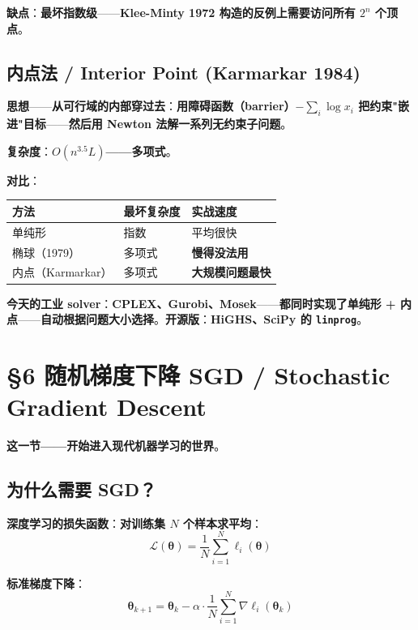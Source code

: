 \textbf{缺点}：\textbf{最坏指数级}——\textbf{Klee-Minty 1972 构造的反例上\textbf{需要访问所有 $2^n$ 个顶点}}。

\subsection{内点法 / Interior Point (Karmarkar 1984)}

\textbf{思想}——\textbf{从可行域的\textbf{内部}穿过去}：\textbf{用\textbf{障碍函数}（barrier）$-\sum_i \log x_i$ 把约束"嵌进"目标}——\textbf{然后用 Newton 法解一系列无约束子问题}。

\textbf{复杂度}：\textbf{$O(n^{3.5} L)$——多项式}。

\textbf{对比}：

\begin{tcolorbox}[essbox={LP 算法对比}]
\begin{tabular}{lll}
\toprule
\textbf{方法} & \textbf{最坏复杂度} & \textbf{实战速度} \\
\midrule
单纯形 & 指数 & 平均很快 \\
椭球（1979） & 多项式 & \textbf{慢得没法用} \\
内点（Karmarkar） & 多项式 & \textbf{大规模问题最快} \\
\bottomrule
\end{tabular}
\end{tcolorbox}

\textbf{今天的工业 solver}：\textbf{CPLEX、Gurobi、Mosek}——\textbf{都同时实现了单纯形 + 内点}——\textbf{自动根据问题大小选择}。\textbf{开源版}：\textbf{HiGHS、SciPy 的 \texttt{linprog}}。

\section{§6 随机梯度下降 SGD / Stochastic Gradient Descent}

\textbf{这一节——开始进入现代机器学习的世界}。

\subsection{为什么需要 SGD？}

\textbf{深度学习的损失函数}：\textbf{对训练集 $N$ 个样本求平均}：
\begin{equation}
\mathcal{L}(\bm \theta) = \frac{1}{N} \sum_{i=1}^N \ell_i(\bm \theta)
\end{equation}

\textbf{标准梯度下降}：
\begin{equation}
\bm \theta_{k+1} = \bm \theta_k - \alpha \cdot \frac{1}{N} \sum_{i=1}^N \nabla \ell_i(\bm \theta_k)
\end{equation}

